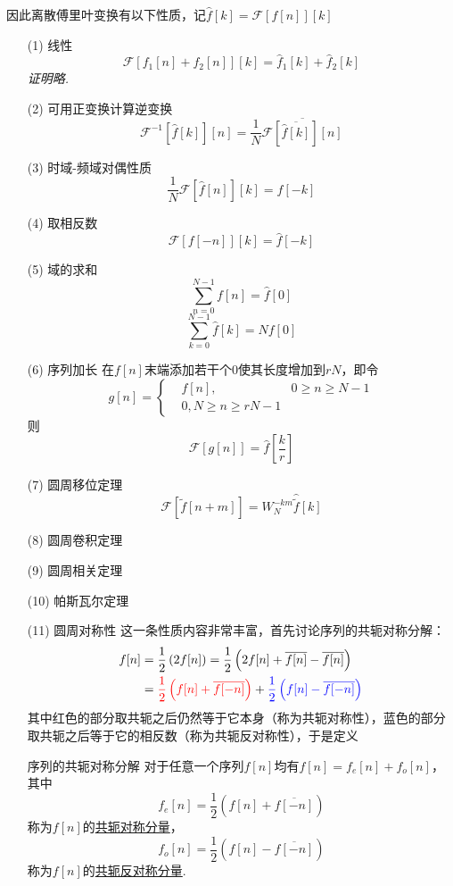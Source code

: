 \documentclass[main.tex]{subfiles}
\begin{document}
因此离散傅里叶变换有以下性质，记\(\hat{f}[k]=\mathcal{F}[f[n]][k]\)
\begin{itemize}
    \item [(1)] 线性
    \[\mathcal{F}[f_1[n]+f_2[n]][k]=\hat{f}_1[k]+\hat{f}_2[k]\]
    \textit{
        证明略.
    }
    \item [(2)] 可用正变换计算逆变换
    \[\mathcal{F}^{-1}\left[\hat{f}[k]\right][n] = \frac{1}{N}\overline{\mathcal{F}\left[\overline{\hat{f}[k]}\right][n]}\]
    \item [(3)] 时域-频域对偶性质
    \[\frac{1}{N}\mathcal{F}\left[\hat{f}[n]\right][k]=f[-k]\]
    \item [(4)] 取相反数
    \[\mathcal{F}[f[-n]][k]=\hat{f}[-k]\]
    \item [(5)] 域的求和
    \[\sum_{n=0}^{N-1}f[n]=\hat{f}[0]\]
    \[\sum_{k=0}^{N-1}\hat{f}[k]=Nf[0]\]
    \item [(6)] 序列加长
    在\(f[n]\)末端添加若干个\(0\)使其长度增加到\(rN\)，即令
    \[g[n]=\left\{\begin{aligned}& f[n], & 0 \geq n \geq N-1 \\ & 0, N \geq n \geq rN-1 \end{aligned}\right.\]
    则
    \[\mathcal{F}[g[n]]=\hat{f}\left[\frac{k}{r}\right]\]
    \item [(7)] 圆周移位定理
    \[\mathcal{F}\left[\tilde{f}[n+m]\right]=W_N^{-km}\hat{\tilde{f}}[k]\]
    \item [(8)] 圆周卷积定理
    \item [(9)] 圆周相关定理
    \item [(10)] 帕斯瓦尔定理
    \item [(11)] 圆周对称性
    \newline
    这一条性质内容非常丰富，首先讨论序列的共轭对称分解：
    \begin{align*}
        f[n] & =\frac{1}{2}\left(2f[n]\right)=\frac{1}{2}\left(2f[n]+\overline{f[n]}-\overline{f[n]}\right) \\
        &= {\color{red}\frac{1}{2}\left(f[n]+\overline{f[-n]}\right)}+{\color{blue}\frac{1}{2}\left(f[n]-\overline{f[-n]}\right)}
    \end{align*}
    其中红色的部分取共轭之后仍然等于它本身（称为共轭对称性），蓝色的部分取共轭之后等于它的相反数（称为共轭反对称性），于是定义
    \begin{definition}{序列的共轭对称分解}
        对于任意一个序列\(f[n]\)均有\(f[n]=f_e[n]+f_o[n]\)，其中
        \[f_e[n]=\frac{1}{2}\left(f[n]+\overline{f[-n]}\right)\]
        称为\(f[n]\)的\uline{共轭对称分量}，
        \[f_o[n]=\frac{1}{2}\left(f[n]-\overline{f[-n]}\right)\]
        称为\(f[n]\)的\uline{共轭反对称分量}.
    \end{definition}
\end{itemize}
\end{document}
